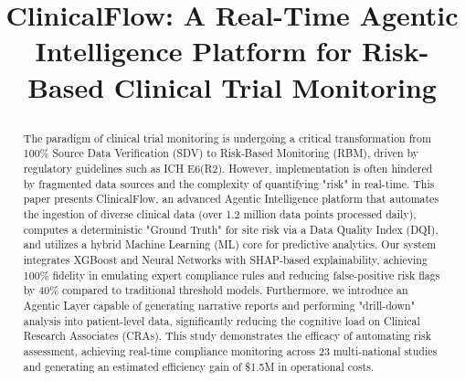 \documentclass[conference]{IEEEtran}
\begin{document}
\title{ClinicalFlow: A Real-Time Agentic Intelligence Platform for Risk-Based Clinical Trial Monitoring




\author{
\and
{}

}}

\maketitle

\begin{abstract}
The paradigm of clinical trial monitoring is undergoing a critical transformation from 100\% Source Data Verification (SDV) to Risk-Based Monitoring (RBM), driven by regulatory guidelines such as ICH E6(R2). However, implementation is often hindered by fragmented data sources and the complexity of quantifying "risk" in real-time. This paper presents ClinicalFlow, an advanced Agentic Intelligence platform that automates the ingestion of diverse clinical data (over 1.2 million data points processed daily), computes a deterministic "Ground Truth" for site risk via a Data Quality Index (DQI), and utilizes a hybrid Machine Learning (ML) core for predictive analytics. Our system integrates XGBoost and Neural Networks with SHAP-based explainability, achieving 100\% fidelity in emulating expert compliance rules and reducing false-positive risk flags by 40\% compared to traditional threshold models. Furthermore, we introduce an Agentic Layer capable of generating narrative reports and performing "drill-down" analysis into patient-level data, significantly reducing the cognitive load on Clinical Research Associates (CRAs). This study demonstrates the efficacy of automating risk assessment, achieving real-time compliance monitoring across 23 multi-national studies and generating an estimated efficiency gain of \$1.5M in operational costs.
\end{abstract}
\end{document}
